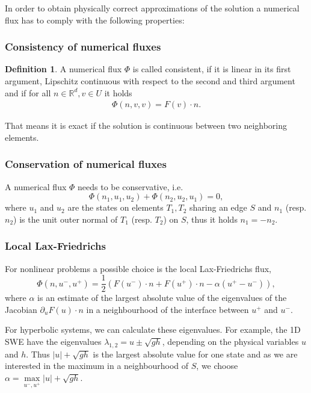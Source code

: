 \documentclass[a4paper,12pt]{article}
\theoremstyle{definition}
\newtheorem{Def}{Definition}
\theoremstyle{definition}
\begin{document}
In order to obtain physically correct approximations of the solution a numerical flux has to comply with the following properties:

\subsubsection*{Consistency of numerical fluxes}
\begin{Def}\label{def:flux:consistency}
	A numerical flux $\Phi$ is called consistent, if it is linear in its first argument, Lipschitz continuous with respect to the second and third argument and if for all $n\in \mathbb{R}^d, v\in U$ it holds
	\begin{align}
	\Phi(n,v,v) = F(v)\cdot n.
	\end{align}
\end{Def}

That means it is exact if the solution is continuous between two neighboring elements.

\subsubsection*{Conservation of numerical fluxes}
A numerical flux $\Phi$ needs to be conservative, i.e.
\begin{equation}
\Phi(n_1,u_1,u_2) + \Phi(n_2, u_2, u_1) = 0,
\end{equation}
where $u_1$ and $u_2$ are the states on elements $T_1, T_2$ sharing an edge $S$ and $n_1$ (resp. $n_2$) is the unit outer normal of $T_1$ (resp. $T_2$) on $S$, thus it holds $n_1 = -n_2$.

\subsubsection{Local Lax-Friedrichs}

For nonlinear problems a possible choice is the local Lax-Friedrichs flux,
\begin{equation}
\Phi (n, u^-, u^+) = \frac{1}{2}\left(F(u^-)\cdot n + F(u^+)\cdot n - \alpha (u^+ -u^- )\right),
\end{equation}
where $\alpha$ is an estimate of the largest absolute value of the eigenvalues of the Jacobian $\partial_u F(u)\cdot n$ in a neighbourhood of the interface between $u^+$ and $u^-$.


For hyperbolic systems, we can calculate these eigenvalues.
For example, the 1D SWE have the eigenvalues $\lambda_{1,2} = u \pm \sqrt{gh}$, depending on the physical variables $u$ and $h$. Thus $\vert u \vert +\sqrt{gh}$ is the largest absolute value for one state and as we are interested in the maximum in a neighbourhood of $S$, we choose $\alpha = \max\limits_{u^-, u^+} \vert u \vert +\sqrt{gh}$.
\end{document}

